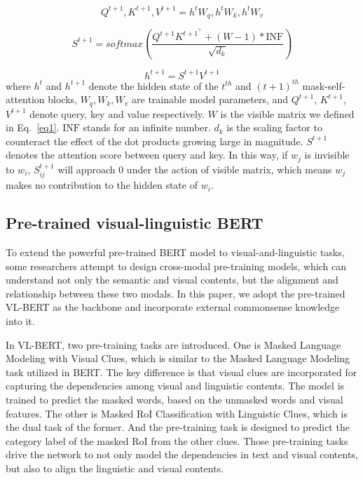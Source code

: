 \documentclass[conference]{IEEEtran}
\begin{document}
\begin{equation}
{Q}^{t+1}, {K}^{t+1}, {V}^{t+1}=h^{t} {W}_{q}, h^t {W}_k, h^t {W}_v
\end{equation}

\begin{equation}
S^{t+1}={softmax}\left(\frac{Q^{t+1} K^{t+1^{\top}}+(W-1)* \mathrm{INF}}{\sqrt{d_{k}}}\right)
\end{equation}


\begin{equation}
h^{t+1}=S^{t+1} {V}^{t+1}
\end{equation}
where $h^{{t}}$ and $h^{t+1}$ denote the hidden state of the $t^{th}$ and $(t+1)^{th}$ mask-self-attention blocks, ${W}_q, {W}_k, {W}_v$ are trainable model parameters, and $Q^{t+1}$, $K^{t+1}$,  $V^{t+1}$ denote query, key and value respectively. ${W}$ is the visible matrix we defined in Eq.~\ref{eq1}. $\mathrm{INF}$ stands for an infinite number. $d_k$ is the scaling factor to counteract the effect of the dot products growing large in magnitude. $S^{t+1}$ denotes the attention score between query and key. In this way, if $w_j$ is invisible to $w_i$, $S^{t+1}_{ij}$ will approach 0 under the action of visible matrix, which means $w_j$ makes no contribution to the hidden state of $w_i$.




\subsection{Pre-trained visual-linguistic BERT}\label{D}
To extend the powerful pre-trained BERT model to visual-and-linguistic tasks, some researchers attempt to design cross-modal pre-training models, which can understand not only the semantic and visual contents, but the alignment and relationship between these two modals. In this paper, we adopt the pre-trained VL-BERT \cite{b14} as the backbone and incorporate external commonsense knowledge into it. 

In VL-BERT, two pre-training tasks are introduced. One is Masked Language Modeling with Visual Clues, which is similar to the Masked Language Modeling task utilized in BERT. The key difference is that visual clues are incorporated for capturing the dependencies among visual and linguistic contents. The model is trained to predict the masked words, based on the unmasked words and visual features. The other is Masked RoI Classification with Linguistic Clues, which is the dual task of the former. And the pre-training task is designed to predict the category label of the masked RoI from the other clues. Those pre-training tasks drive the network to not only model the dependencies in text and visual contents, but also to align the linguistic and visual contents.
\end{document}
